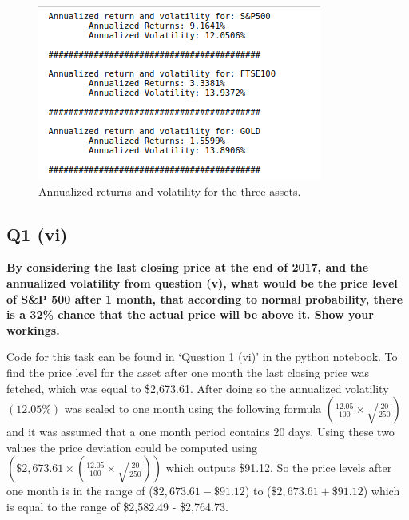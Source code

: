 \begin{figure}[H]
\centering
  \includegraphics[scale = .75]{imgs/annualize_asset_results.png}
  \caption{Annualized returns and volatility for the three assets. }
  \label{fig:annassetresult}
\end{figure}



\subsection{Q1 (vi)}\label{sssec:pt1q1vi}

\textbf{By considering the last closing price at the end of 2017, and the annualized volatility from question (v), what would be the price level of S&P 500 after 1 month, that according to normal probability, there is a 32\% chance that the actual price will be above it. Show your workings.}

\noindent
Code for this task can be found in ‘Question 1 (vi)’ in the python notebook. To find the price level for the asset after one month the last closing price was fetched, which was equal to \$2,673.61. After doing so the annualized volatility $(12.05\%)$ was scaled to one month using the following formula $(\frac{12.05}{100} \times \sqrt{\frac{20}{250}})$ and it was assumed that a one month period contains 20 days. Using these two values the price deviation could be computed using $(\$2,673.61 \times (\frac{12.05}{100} \times \sqrt{\frac{20}{250}}))$ which outputs \$91.12. So the price levels after one month is in the range of ($\$2,673.61 - \$91.12$) to ($\$2,673.61 + \$91.12$) which is equal to the range of \$2,582.49 - \$2,764.73.

